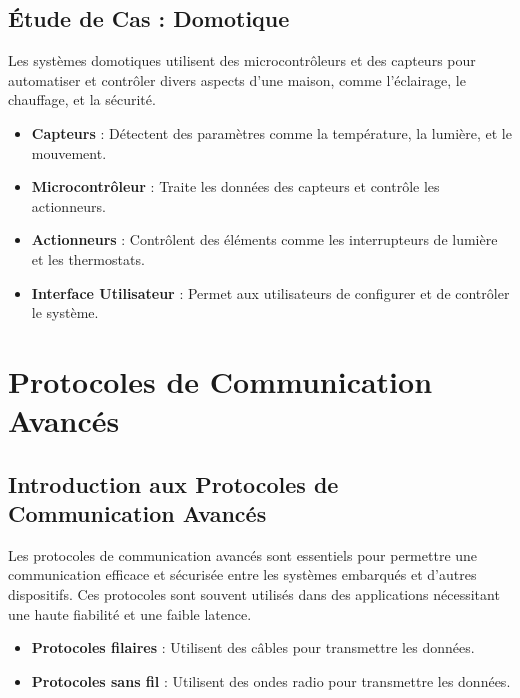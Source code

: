 \documentclass[10pt,a4paper]{article}
\begin{document}

\subsection*{Étude de Cas : Domotique}

Les systèmes domotiques utilisent des microcontrôleurs et des capteurs pour automatiser et contrôler divers aspects d'une maison, comme l'éclairage, le chauffage, et la sécurité.

\begin{itemize}
    \item \textbf{Capteurs} : Détectent des paramètres comme la température, la lumière, et le mouvement.
    \item \textbf{Microcontrôleur} : Traite les données des capteurs et contrôle les actionneurs.
    \item \textbf{Actionneurs} : Contrôlent des éléments comme les interrupteurs de lumière et les thermostats.
    \item \textbf{Interface Utilisateur} : Permet aux utilisateurs de configurer et de contrôler le système.
\end{itemize}


\section*{Protocoles de Communication Avancés}

\subsection*{Introduction aux Protocoles de Communication Avancés}

Les protocoles de communication avancés sont essentiels pour permettre une communication efficace et sécurisée entre les systèmes embarqués et d'autres dispositifs. Ces protocoles sont souvent utilisés dans des applications nécessitant une haute fiabilité et une faible latence.

\begin{itemize}
    \item \textbf{Protocoles filaires} : Utilisent des câbles pour transmettre les données.
    \item \textbf{Protocoles sans fil} : Utilisent des ondes radio pour transmettre les données.
\end{itemize}
\end{document}
